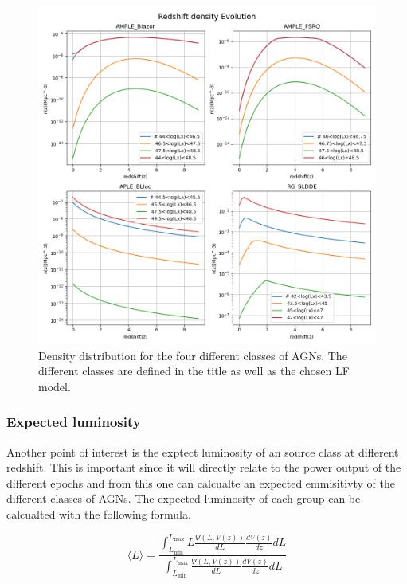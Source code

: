 \documentclass{article}
\begin{document}
\begin{figure}
    \centering
    \includegraphics[width = \textwidth]{Redshift density Evolution.png}
    \caption{Density distribution for the four different classes of AGNs. The different classes are defined in the title as well as the chosen LF model.}
    \label{fig:DD}
\end{figure}



\subsubsection{Expected luminosity}
Another point of interest is the exptect luminosity of an source class at different redshift. This is important since it will directly relate to the 
power output of the different epochs and from this one can calcualte an expected emmisitivty of the different classes of AGNs. 
The expected luminosity of each group can be calcualted with the following formula. 

\begin{equation}
    \langle L \rangle = \frac{\int_{L_{\text{min}}}^{L_{\text{max}}} L \frac{\Psi(L, V(z))}{dL} \frac{dV(z)}{dz} dL}{\int_{L_{\text{min}}}^{L_{\text{max}}} \frac{\Psi(L, V(z))}{dL} \frac{dV(z)}{dz} dL}
\end{equation}
\end{document}
